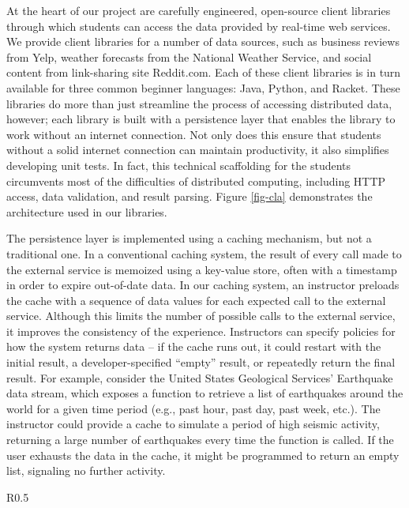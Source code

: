 At the heart of our project are carefully engineered, open-source client libraries through which students can access the data provided by real-time web services.
We provide client libraries for a number of data sources, such as business reviews from Yelp, weather forecasts from the National Weather Service, and social content from link-sharing site Reddit.com.
Each of these client libraries is in turn available for three common beginner languages: Java, Python, and Racket. 
These libraries do more than just streamline the process of accessing distributed data, however; each library is built with a persistence layer that enables the library to work without an internet connection.
Not only does this ensure that students without a solid internet connection can maintain productivity, it also simplifies developing unit tests. 
In fact, this technical scaffolding for the students circumvents most of the difficulties of distributed computing, including HTTP access, data validation, and result parsing.
Figure \ref{fig-cla} demonstrates the architecture used in our libraries.

The persistence layer is implemented using a caching mechanism, but not a traditional one.
In a conventional caching system, the result of every call made to the external service is memoized using a key-value store, often with a timestamp in order to expire out-of-date data.
In our caching system, an instructor preloads the cache with a sequence of data values for each expected call to the external service.
Although this limits the number of possible calls to the external service, it improves the consistency of the experience.
Instructors can specify policies for how the system returns data -- if the cache runs out, it could restart with the initial result, a developer-specified ``empty'' result, or repeatedly return the final result.
For example, consider the United States Geological Services' Earthquake data stream, which exposes a function to retrieve a list of earthquakes around the world for a given time period (e.g., past hour, past day, past week, etc.). 
The instructor could provide a cache to simulate a period of high seismic activity, returning a large number of earthquakes every time the function is called.
If the user exhausts the data in the cache, it might be programmed to return an empty list, signaling no further activity.

\begin{wrapfigure}{R}{0.5\textwidth}
    \begin{center}
    \end{center}
    \vspace{-\bigskipamount}
    \caption{RealTimeWeb Client Library Architecture}
    \label{fig-cla}
\end{wrapfigure}

